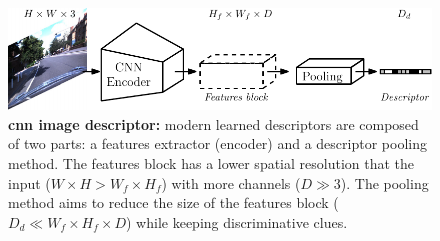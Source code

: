 \begin{figure}
	\centering
	
	\includegraphics[width=\linewidth]{related_work/learned_desc}
	
	\caption[\acs{cnn} image descriptor]{\label{fig:cnn_aggregation} \textbf{\acs{cnn} image descriptor:} modern learned descriptors are composed of two parts: a features extractor (encoder) and a descriptor pooling method. The features block has a lower spatial resolution that the input ($W\times H > W_f\times H_f$) with more channels ($D \gg 3$). The pooling method aims to reduce the size of the features block ($D_d \ll W_f\times H_f\times D$) while keeping discriminative clues.}	
	
\end{figure}